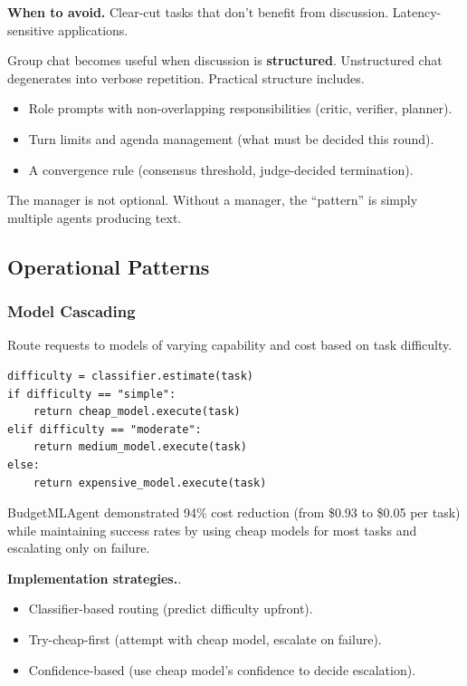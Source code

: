 \textbf{When to avoid.} Clear-cut tasks that don't benefit from discussion. Latency-sensitive applications.

Group chat becomes useful when discussion is \textbf{structured}. Unstructured chat degenerates into verbose repetition. Practical structure includes.
\begin{itemize}
\item Role prompts with non-overlapping responsibilities (critic, verifier, planner).
\item Turn limits and agenda management (what must be decided this round).
\item A convergence rule (consensus threshold, judge-decided termination).
\end{itemize}
The manager is not optional. Without a manager, the ``pattern'' is simply multiple agents producing text.

\subsection{Operational Patterns}

\subsubsection{Model Cascading}

Route requests to models of varying capability and cost based on task difficulty.

\begin{verbatim}
difficulty = classifier.estimate(task)
if difficulty == "simple":
    return cheap_model.execute(task)
elif difficulty == "moderate":
    return medium_model.execute(task)
else:
    return expensive_model.execute(task)
\end{verbatim}

BudgetMLAgent \cite{budgetmlagent2024} demonstrated 94\% cost reduction (from \$0.93 to \$0.05 per task) while maintaining success rates by using cheap models for most tasks and escalating only on failure.

\textbf{Implementation strategies.}.
\begin{itemize}
\item Classifier-based routing (predict difficulty upfront).
\item Try-cheap-first (attempt with cheap model, escalate on failure).
\item Confidence-based (use cheap model's confidence to decide escalation).
\end{itemize}


